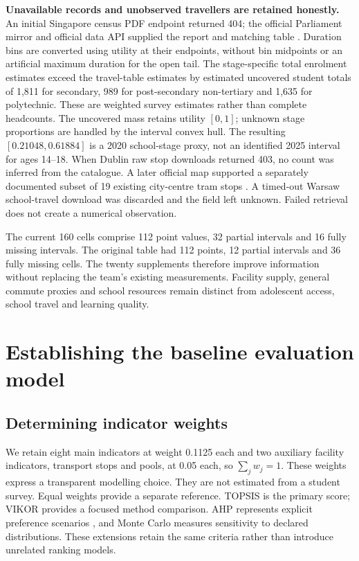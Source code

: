 \textbf{Unavailable records and unobserved travellers are retained honestly.}
An initial Singapore census PDF endpoint returned 404; the official Parliament
mirror and official data API supplied the report and matching table
\cite{singapore}. Duration bins are converted using utility at their endpoints,
without bin midpoints or an artificial maximum duration for the open tail.
The stage-specific total enrolment estimates exceed the travel-table estimates
by estimated uncovered student totals of 1,811 for secondary, 989 for
post-secondary non-tertiary and 1,635 for polytechnic. These are weighted
survey estimates rather than complete headcounts. The uncovered mass retains
utility $[0,1]$; unknown stage proportions are
handled by the interval convex hull. The resulting $[0.21048,0.61884]$ is a
2020 school-stage proxy, not an identified 2025 interval for ages 14--18.
When Dublin raw stop downloads returned 403, no count was inferred from the
catalogue. A later official map supported a separately documented subset of
19 existing city-centre tram stops \cite{dublin}. A timed-out Warsaw school-travel download
was discarded and the field left unknown. Failed retrieval does not create a
numerical observation.

The current 160 cells comprise 112 point values, 32 partial intervals and
16 fully missing intervals. The original table had 112 points, 12 partial
intervals and 36 fully missing cells. The twenty supplements therefore improve
information without replacing the team's existing measurements. Facility supply,
general commute proxies and school resources remain distinct from adolescent
access, school travel and learning quality.

\section{Establishing the baseline evaluation model}
\subsection{Determining indicator weights}
We retain eight main indicators at weight 0.1125 each and two auxiliary facility
indicators, transport stops and pools, at 0.05 each, so $\sum_jw_j=1$.
These weights express a transparent modelling choice. They are not estimated
from a student survey. Equal weights provide a separate reference.
TOPSIS is the primary score; VIKOR provides a focused method comparison.
AHP represents explicit preference scenarios \cite{saaty}, and Monte Carlo measures
sensitivity to declared distributions. These extensions retain the same
criteria rather than introduce unrelated ranking models.


